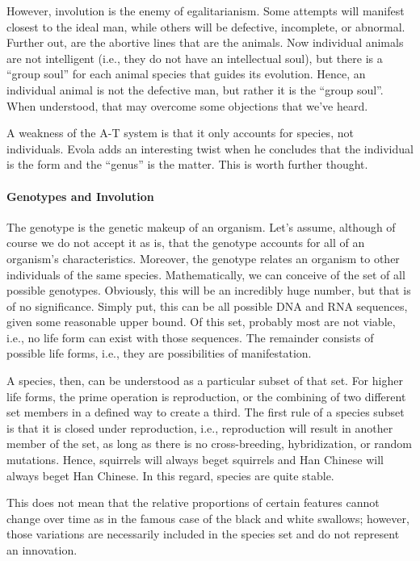 However, involution is the enemy of egalitarianism. Some attempts will manifest closest to the ideal man, while others will be defective, incomplete, or abnormal. Further out, are the abortive lines that are the animals. Now individual animals are not intelligent (i.e., they do not have an intellectual soul), but there is a ``group soul'' for each animal species that guides its evolution. Hence, an individual animal is not the defective man, but rather it is the ``group soul''. When understood, that may overcome some objections that we've heard.

A weakness of the A-T system is that it only accounts for species, not individuals. Evola adds an interesting twist when he concludes that the individual is the form and the ``genus'' is the matter. This is worth further thought.

\paragraph{Genotypes and Involution}


The genotype is the genetic makeup of an organism. Let's assume, although of course we do not accept it as is, that the genotype accounts for all of an organism's characteristics. Moreover, the genotype relates an organism to other individuals of the same species. Mathematically, we can conceive of the set of all possible genotypes. Obviously, this will be an incredibly huge number, but that is of no significance. Simply put, this can be all possible DNA and RNA sequences, given some reasonable upper bound. Of this set, probably most are not viable, i.e., no life form can exist with those sequences. The remainder consists of possible life forms, i.e., they are possibilities of manifestation.

A species, then, can be understood as a particular subset of that set. For higher life forms, the prime operation is reproduction, or the combining of two different set members in a defined way to create a third. The first rule of a species subset is that it is closed under reproduction, i.e., reproduction will result in another member of the set, as long as there is no cross-breeding, hybridization, or random mutations. Hence, squirrels will always beget squirrels and Han Chinese will always beget Han Chinese. In this regard, species are quite stable.

This does not mean that the relative proportions of certain features cannot change over time as in the famous case of the black and white swallows; however, those variations are necessarily included in the species set and do not represent an innovation.

